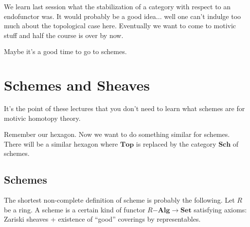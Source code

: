 \documentclass[../MH_Total.tex]{subfiles}
\begin{document}


We learn last session what the stabilization of a category with respect to an endofunctor was. It would probably be a good idea... well one can't indulge too much about the topological case here. Eventually we want to come to motivic stuff and half the course is over by now.

Maybe it's a good time to go to schemes.

\section{Schemes and Sheaves}
It's the point of these lectures that you don't need to learn what schemes are for motivic homotopy theory. 

Remember our hexagon. Now we want to do something similar for schemes. There will be a similar hexagon where $\mathbf{Top}$ is replaced by the category $\mathbf{Sch}$ of schemes.

\subsection{Schemes}
The shortest non-complete definition of scheme is probably the following. Let $R$ be a ring. A scheme is a certain kind of functor $R\mathbf{-Alg} \to \mathbf{Set}$ satisfying axioms: Zariski sheaves + existence of ``good'' coverings by representables.
\end{document}
